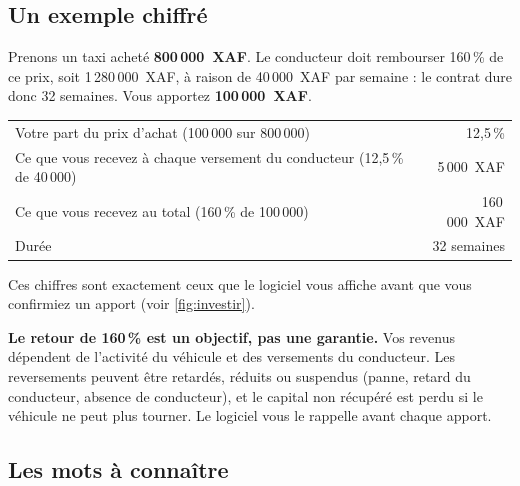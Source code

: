 \documentclass[11pt,a4paper]{article}
\newcommand{\Needspace}[1]{\par\ifdim\pagegoal<\maxdimen\ifdim\dimexpr\pagegoal-\pagetotal\relax<#1\relax\newpage\fi\fi}
\let\oldsubsection\subsection
\renewcommand{\subsection}{\Needspace{5.5cm}\oldsubsection}
\begin{document}
\subsection{Un exemple chiffré}

Prenons un taxi acheté \textbf{800\,000~XAF}. Le conducteur doit rembourser 160\,\% de ce prix, soit 1\,280\,000~XAF, à raison de 40\,000~XAF par semaine : le contrat dure donc 32 semaines. Vous apportez \textbf{100\,000~XAF}.

\begin{center}
\begin{tabularx}{0.92\linewidth}{@{}Xr@{}}
\toprule
Votre part du prix d'achat (100\,000 sur 800\,000) & 12,5\,\%\\
Ce que vous recevez à chaque versement du conducteur (12,5\,\% de 40\,000) & 5\,000~XAF\\
Ce que vous recevez au total (160\,\% de 100\,000) & 160\,000~XAF\\
Durée & 32 semaines\\
\bottomrule
\end{tabularx}
\end{center}

Ces chiffres sont exactement ceux que le logiciel vous affiche avant que vous confirmiez un apport (voir \autoref{fig:investir}).

\begin{attention}
\textbf{Le retour de 160\,\% est un objectif, pas une garantie.} Vos revenus dépendent de l'activité du véhicule et des versements du conducteur. Les reversements peuvent être retardés, réduits ou suspendus (panne, retard du conducteur, absence de conducteur), et le capital non récupéré est perdu si le véhicule ne peut plus tourner. Le logiciel vous le rappelle avant chaque apport.
\end{attention}

\subsection{Les mots à connaître}
\end{document}
